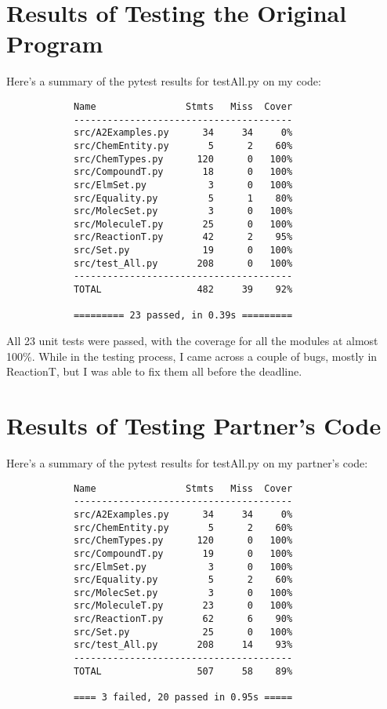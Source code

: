 \documentclass[12pt]{article}
\begin{document}
\section{Results of Testing the Original Program}
Here's a summary of the pytest results for testAll.py on my code:

\begin{lstlisting}
            Name                Stmts   Miss  Cover
            ---------------------------------------
            src/A2Examples.py      34     34     0%
            src/ChemEntity.py       5      2    60%
            src/ChemTypes.py      120      0   100%
            src/CompoundT.py       18      0   100%
            src/ElmSet.py           3      0   100%
            src/Equality.py         5      1    80%
            src/MolecSet.py         3      0   100%
            src/MoleculeT.py       25      0   100%
            src/ReactionT.py       42      2    95%
            src/Set.py             19      0   100%
            src/test_All.py       208      0   100%
            ---------------------------------------
            TOTAL                 482     39    92%

            ========= 23 passed, in 0.39s =========
\end{lstlisting}

All 23 unit tests were passed, with the coverage for all the modules at almost 100\%. While in the testing process, I came across a couple of bugs, mostly in ReactionT, but I was able to fix them all before the deadline.


\section{Results of Testing Partner's Code}
Here's a summary of the pytest results for testAll.py on my partner's code:
\begin{lstlisting}
            Name                Stmts   Miss  Cover
            ---------------------------------------
            src/A2Examples.py      34     34     0%
            src/ChemEntity.py       5      2    60%
            src/ChemTypes.py      120      0   100%
            src/CompoundT.py       19      0   100%
            src/ElmSet.py           3      0   100%
            src/Equality.py         5      2    60%
            src/MolecSet.py         3      0   100%
            src/MoleculeT.py       23      0   100%
            src/ReactionT.py       62      6    90%
            src/Set.py             25      0   100%
            src/test_All.py       208     14    93%
            ---------------------------------------
            TOTAL                 507     58    89%

            ==== 3 failed, 20 passed in 0.95s =====
\end{lstlisting}
\end{document}
